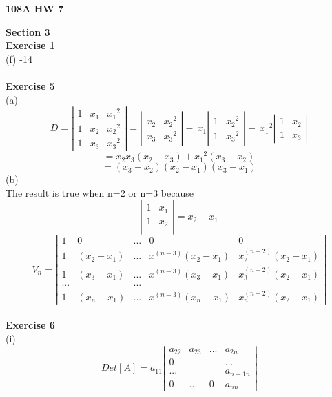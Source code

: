 \documentclass[12pt]{amsart}
\begin{document}
\begin{center}
{\bf 108A HW 7 }\\
\end{center}
\textbf{Section 3} \\
\textbf{Exercise 1}\\
(f) -14\\
\\
\textbf{Exercise 5}\\
(a)  
\[ 
D =
\left|\begin{array}{cccc} 
    1 &    x_1    & {x_1}^2 \\ 
    1 &    x_2    & {x_2}^2\\ 
    1 &    x_3    & {x_3}^2 
\end{array}\right| 
=
\left|\begin{array}{cccc}  
    x_2    & {x_2}^2\\ 
    x_3    & {x_3}^2 
\end{array}\right|
-\ x_1
\left|\begin{array}{cccc}  
    1    & {x_2}^2\\ 
    1    & {x_3}^2 
\end{array}\right|
-\ {x_1}^2
\left|\begin{array}{cccc}  
    1    & {x_2}\\ 
    1    & {x_3} 
\end{array}\right|
\]
\[
= x_2 x_3(x_2 -x_3)+{x_1}^2(x_3 - x_2)
\]
\[
=(x_3 - x_2)(x_2 - x_1)(x_3 -x_1)
\]
(b)\\
The result is true when n=2 or n=3 because
\[
\left|\begin{array}{cccc} 
    1 &    x_1   \\ 
    1 &    x_2   \\ 
\end{array}\right| 
= x_2-x_1
\]
\[
V_n=
\left|\begin{array}{cccccc} 
    1& 0&... & 0 & 0 \\ 
    1&(x_2-x_1)&...&x^{(n-3)}(x_2-x_1)&x^{(n-2)}_{2}(x_2-x_1)\\
    1&(x_3-x_1)&...&x^{(n-3)}(x_3-x_1)&x^{(n-2)}_{3}(x_2-x_1)\\ 
    ...&&...&&\\
    1&(x_n-x_1)&...&x^{(n-3)}(x_n-x_1)&x^{(n-2)}_{n}(x_2-x_1)
\end{array}\right| 
\]
\\
\textbf{Exercise 6}\\
(i)\\
\[
Det[A] =
a_{11}
\left|\begin{array}{cccc} 
    a_{22} & a_{23} & ... & a_{2n} \\ 
    0 &  & &...\\
    ... &    &  & a_{{n-1}n}\\ 
    0 & ...  & 0 & a_{nn} 
\end{array}\right| 
\]
\end{document}
